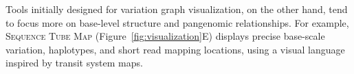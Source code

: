 Tools initially designed for variation graph visualization, on the other hand, tend to focus more on base-level structure and pangenomic relationships.
For example, \textsc{Sequence Tube Map} \cite{Beyer_2019} (Figure~\ref{fig:visualization}E) displays precise base-scale variation, haplotypes, and short read mapping locations, using a visual language inspired by transit system maps.



